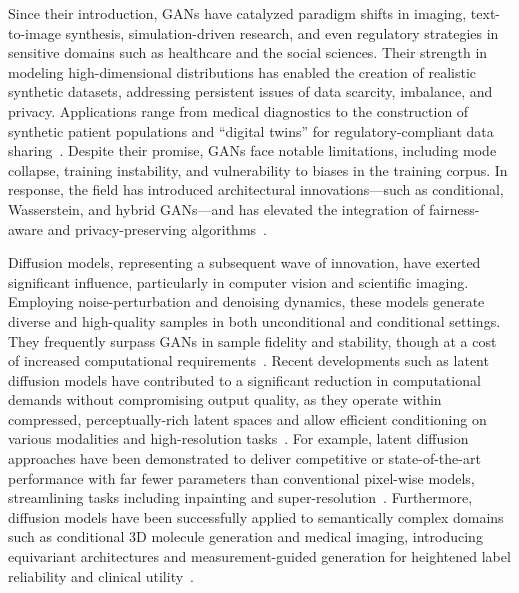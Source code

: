 \documentclass[sigconf]{acmart}
\begin{document}
Since their introduction, GANs have catalyzed paradigm shifts in imaging, text-to-image synthesis, simulation-driven research, and even regulatory strategies in sensitive domains such as healthcare and the social sciences. Their strength in modeling high-dimensional distributions has enabled the creation of realistic synthetic datasets, addressing persistent issues of data scarcity, imbalance, and privacy. Applications range from medical diagnostics to the construction of synthetic patient populations and ``digital twins'' for regulatory-compliant data sharing~\cite{ref74,ref90,ref91,ref92,ref94,ref99}. Despite their promise, GANs face notable limitations, including mode collapse, training instability, and vulnerability to biases in the training corpus. In response, the field has introduced architectural innovations---such as conditional, Wasserstein, and hybrid GANs---and has elevated the integration of fairness-aware and privacy-preserving algorithms~\cite{ref75,ref94,ref98,ref99}.

Diffusion models, representing a subsequent wave of innovation, have exerted significant influence, particularly in computer vision and scientific imaging. Employing noise-perturbation and denoising dynamics, these models generate diverse and high-quality samples in both unconditional and conditional settings. They frequently surpass GANs in sample fidelity and stability, though at a cost of increased computational requirements~\cite{ref82,ref96,ref97,ref101}. Recent developments such as latent diffusion models have contributed to a significant reduction in computational demands without compromising output quality, as they operate within compressed, perceptually-rich latent spaces and allow efficient conditioning on various modalities and high-resolution tasks~\cite{ref100,ref102}. For example, latent diffusion approaches have been demonstrated to deliver competitive or state-of-the-art performance with far fewer parameters than conventional pixel-wise models, streamlining tasks including inpainting and super-resolution~\cite{ref100}. Furthermore, diffusion models have been successfully applied to semantically complex domains such as conditional 3D molecule generation and medical imaging, introducing equivariant architectures and measurement-guided generation for heightened label reliability and clinical utility~\cite{ref74,ref91,ref102}.
\end{document}
